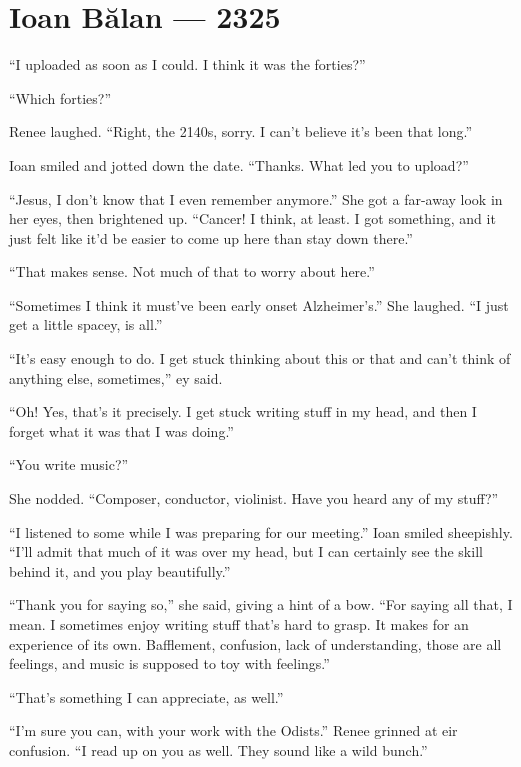 \hypertarget{ioan-bux103lan-2325}{%
\chapter{Ioan Bălan — 2325}\label{ioan-bux103lan-2325}}

``I uploaded as soon as I could. I think it was the forties?''

``Which forties?''

Renee laughed. ``Right, the 2140s, sorry. I can't believe it's been that long.''

Ioan smiled and jotted down the date. ``Thanks. What led you to upload?''

``Jesus, I don't know that I even remember anymore.'' She got a far-away look in her eyes, then brightened up. ``Cancer! I think, at least. I got something, and it just felt like it'd be easier to come up here than stay down there.''

``That makes sense. Not much of that to worry about here.''

``Sometimes I think it must've been early onset Alzheimer's.'' She laughed. ``I just get a little spacey, is all.''

``It's easy enough to do. I get stuck thinking about this or that and can't think of anything else, sometimes,'' ey said.

``Oh! Yes, that's it precisely. I get stuck writing stuff in my head, and then I forget what it was that I was doing.''

``You write music?''

She nodded. ``Composer, conductor, violinist. Have you heard any of my stuff?''

``I listened to some while I was preparing for our meeting.'' Ioan smiled sheepishly. ``I'll admit that much of it was over my head, but I can certainly see the skill behind it, and you play beautifully.''

``Thank you for saying so,'' she said, giving a hint of a bow. ``For saying all that, I mean. I sometimes enjoy writing stuff that's hard to grasp. It makes for an experience of its own. Bafflement, confusion, lack of understanding, those are all feelings, and music is supposed to toy with feelings.''

``That's something I can appreciate, as well.''

``I'm sure you can, with your work with the Odists.'' Renee grinned at eir confusion. ``I read up on you as well. They sound like a wild bunch.''

